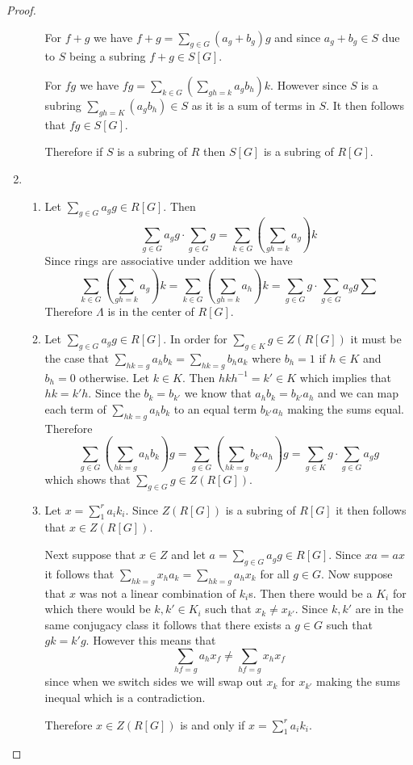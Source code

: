\documentclass[10pt]{article}
\theoremstyle{plain}
\theoremstyle{remark}
\begin{document}
\begin{proof}
\begin{enumerate}
\begin{enumerate}
      For $f+g$ we have $f+g=\sum_{g\in G}(a_g+b_g)g$ and since $a_g+b_g\in S$ due to
      $S$ being a subring $f+g\in S[G]$.

      For $fg$ we have $fg=\sum_{k\in G}\left(\sum_{gh=k}a_gb_h\right)k$. However
      since $S$ is a subring $\sum_{gh=K}(a_gb_h)\in S$ as it is a sum of terms in $S$.
      It then follows that $fg\in S[G]$.

      Therefore if $S$ is a subring of $R$ then $S[G]$ is a subring of $R[G]$.
    \end{enumerate}
  \item
    \begin{enumerate}
    \item Let $\sum_{g\in G}a_gg\in R[G]$. Then
      \[ \sum_{g\in G}a_gg\cdot\sum_{g\in G}g=\sum_{k\in G}\left(\sum_{gh=k}a_g\right)k \]
      Since rings are associative under addition we have
      \[ \sum_{k\in G}\left(\sum_{gh=k}a_g\right)k= \sum_{k\in G}\left(\sum_{gh=k}a_h\right)k
        = \sum_{g\in G}g\cdot\sum_{g\in G}a_gg\sum\]
      Therefore $\Lambda$ is in the center of $R[G]$.
    \item Let $\sum_{g\in G}a_gg\in R[G]$. In order for $\sum_{g\in K}g\in Z(R[G])$ it must be
      the case that $\sum_{hk=g}a_hb_k=\sum_{hk=g}b_ha_k$ where $b_h=1$ if $h\in K$ and
      $b_h=0$ otherwise. Let $k\in K$. Then $hkh^{-1}=k'\in K$ which implies that
      $hk=k'h$. Since the $b_k=b_{k'}$ we know that $a_hb_k=b_{k'}a_h$ and we
      can map each term of $\sum_{hk=g}a_hb_k$ to an equal term $b_{k'}a_h$
      making the sums equal.
      Therefore
            \[ \sum_{g\in G}
        \left(
          \sum_{hk=g}a_hb_k
        \right)g
        =
        \sum_{g\in G}
        \left(
          \sum_{hk=g}b_{k'}a_h
        \right)g
        =
        \sum_{g\in K}g \cdot\sum_{g\in G}a_gg \]
      which shows that $\sum_{g\in G}g\in Z(R[G])$.
    \item Let $x=\sum_1^ra_ik_i$. Since $Z(R[G])$ is a subring of $R[G]$ it then
      follows that $x\in Z(R[G])$.

      Next suppose that $x\in Z$ and let $a=\sum_{g\in G}a_gg\in R[G]$. Since
      $xa=ax$ it follows that $\sum_{hk=g}x_ha_k=\sum_{hk=g}a_hx_k$ for all $g\in G$.
      Now suppose that $x$ was not a linear combination of $k_i$s. Then
      there would be a $K_i$ for which there would be $k,k'\in K_i$ such that
      $x_k\neq x_{k'}$. Since $k,k'$ are in the same conjugacy class it follows
      that there exists a $g\in G$ such that $gk=k'g$. However this means that
      \[ \sum_{hf=g}a_hx_f\neq \sum_{hf=g} x_hx_f \]
      since when we switch sides we will swap out $x_k$ for $x_{k'}$ making the
      sums inequal which is a contradiction.

      Therefore $x\in Z(R[G])$ is and only if $x=\sum_1^ra_ik_i$.
    \end{enumerate}
  \end{enumerate}
\end{proof}
\end{document}
